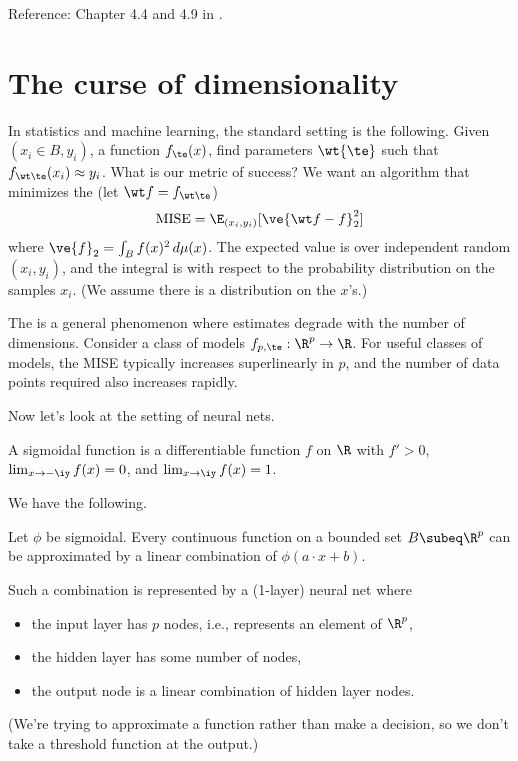 Reference: Chapter 4.4 and 4.9 in \cite{Clarke2009}.

\section{The curse of dimensionality}
In statistics and machine learning, the standard setting is the following. Given $(x_i\in B,y_i)$, a function $f_\te(x)$, find parameters $\wt{\te}$ such that $f_{\wt\te}(x_i)\approx y_i$. What is our metric of success? We want an algorithm that minimizes the  (let $\wt f=f_{\wt \te}$)
\[
\text{MISE}%
= \E_{(x_i,y_i)} [\ve{\wt f-f}_2^2] 
\]
where $\ve{f}_2=\int_B f(x)^2\,d\mu(x)$. The expected value is over independent random $(x_i,y_i)$, and the integral is with respect to the probability distribution on the samples $x_i$. (We assume there is a distribution on the $x$'s.) %

The  is a general phenomenon where estimates degrade with the number of dimensions. Consider a class of models $f_{p,\te}:\R^p\to \R$. For useful classes of models, the MISE typically increases superlinearly in $p$, and the number of data points required also increases rapidly.

Now let's look at the setting of neural nets.

\begin{df}
A sigmoidal function is a differentiable function $f$ on $\R$ with $f'>0$, $\lim_{x\to -\iy}f(x)=0$, and $\lim_{x\to \iy}f(x)=1$.
\end{df}

We have the following.
\begin{pr}
Let $\phi$ be sigmoidal. 
Every continuous function on a bounded set $B\subeq \R^p$ can be approximated by a linear combination of $\phi(a\cdot x+b)$. 
\end{pr}
Such a combination is represented by a (1-layer) neural net where 
\begin{itemize}
\item
the input layer has $p$ nodes, i.e., represents an element of $\R^p$,
\item
the hidden layer has some number of nodes,
\item
the output node is a linear combination of hidden layer nodes.
\end{itemize}
(We're trying to approximate a function rather than make a decision, so we don't take a threshold function at the output.)

